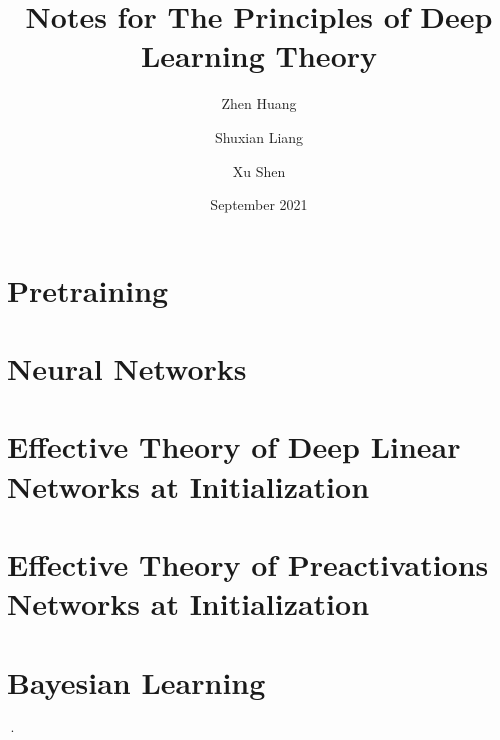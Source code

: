 \documentclass[12pt, letterpaper, twoside]{article}
\title{\textbf{Notes for The Principles of Deep Learning Theory}}
\author{Zhen Huang \and Shuxian Liang \and Xu Shen}
\date{September 2021}
\begin{document}
\begin{titlepage}
\maketitle
\end{titlepage}

\tableofcontents
\newpage

\section{Pretraining}
\label{sec:1}


\section{Neural Networks}
\label{sec:2}


\section{Effective Theory of Deep Linear Networks at Initialization}
\label{sec:3}


\section{Effective Theory of Preactivations Networks at Initialization}
\label{sec:5}


\section{Bayesian Learning}
·
\end{document}
